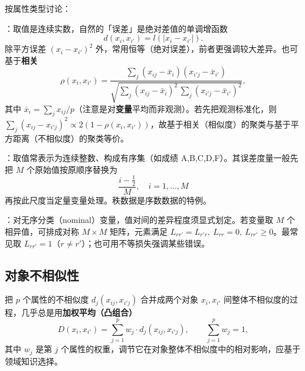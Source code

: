 按属性类型讨论：
\begin{description}[itemsep=1pt]
\item[定量变量]：取值是连续实数，自然的「误差」是绝对差值的单调增函数
\[
d(x_i,x_{i'}) = l(|x_i-x_{i'}|).
\]
除平方误差 $(x_i-x_{i'})^2$ 外，常用恒等（绝对误差），前者更强调较大差异。也可基于\textbf{相关}
\begin{equation}
\rho(x_i,x_{i'}) = \frac{\sum_j (x_{ij}-\bar x_i)(x_{i'j}-\bar x_{i'})}{\sqrt{\sum_j (x_{ij}-\bar x_i)^2\,\sum_j (x_{i'j}-\bar x_{i'})^2}}, \label{eq:14_22}
\end{equation}
其中 $\bar x_i=\sum_j x_{ij}/p$（注意是对\textbf{变量}平均而非观测）。若先把观测标准化，则 $\sum_j(x_{ij}-x_{i'j})^2\propto 2(1-\rho(x_i,x_{i'}))$，故基于相关（相似度）的聚类与基于平方距离（不相似度）的聚类等价。
\item[序数变量]：取值常表示为连续整数、构成有序集（如成绩 A,B,C,D,F）。其误差度量一般先把 $M$ 个原始值按原顺序替换为
\begin{equation}
\frac{i-\frac12}{M},\quad i=1,\dots,M \label{eq:14_23}
\end{equation}
再按此尺度当定量变量处理。秩数据是序数数据的特例。
\item[分类变量]：对无序分类（nominal）变量，值对间的差异程度须显式划定。若变量取 $M$ 个相异值，可排成对称 $M\times M$ 矩阵，元素满足 $L_{rr'}=L_{r'r},\ L_{rr}=0,\ L_{rr'}\ge 0$。最常见取 $L_{rr'}=1$（$r\ne r'$）；也可用不等损失强调某些错误。
\end{description}

\subsection{对象不相似性}

把 $p$ 个属性的不相似度 $d_j(x_{ij},x_{i'j})$ 合并成两个对象 $x_i,x_{i'}$ 间整体不相似度的过程，几乎总是用\textbf{加权平均（凸组合）}
\begin{equation}
D(x_i,x_{i'}) = \sum_{j=1}^{p} w_j\cdot d_j(x_{ij},x_{i'j}),\qquad \sum_{j=1}^{p} w_j = 1, \label{eq:14_24}
\end{equation}
其中 $w_j$ 是第 $j$ 个属性的权重，调节它在对象整体不相似度中的相对影响，应基于领域知识选择。

